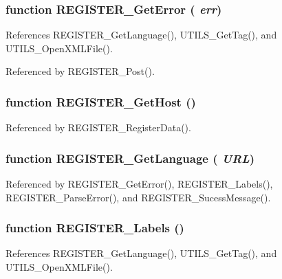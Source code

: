 \subsubsection[REGISTER\_\-GetError]{\setlength{\rightskip}{0pt plus 5cm}function REGISTER\_\-GetError ( {\em err})}\label{register_8js_0f784aa2bb5cd6b876e736d01611a1fe}




References REGISTER\_\-GetLanguage(), UTILS\_\-GetTag(), and UTILS\_\-OpenXMLFile().

Referenced by REGISTER\_\-Post().
\subsubsection[REGISTER\_\-GetHost]{\setlength{\rightskip}{0pt plus 5cm}function REGISTER\_\-GetHost ()}\label{register_8js_60682a7fc707db31243bc09b0db76b40}




Referenced by REGISTER\_\-RegisterData().
\subsubsection[REGISTER\_\-GetLanguage]{\setlength{\rightskip}{0pt plus 5cm}function REGISTER\_\-GetLanguage ( {\em URL})}\label{register_8js_ccbe8a48655edc3a8b9bfc6fd8e71c12}




Referenced by REGISTER\_\-GetError(), REGISTER\_\-Labels(), REGISTER\_\-ParseError(), and REGISTER\_\-SucessMessage().
\subsubsection[REGISTER\_\-Labels]{\setlength{\rightskip}{0pt plus 5cm}function REGISTER\_\-Labels ()}\label{register_8js_c489703e14685fd464a2d071d7938d8b}




References REGISTER\_\-GetLanguage(), UTILS\_\-GetTag(), and UTILS\_\-OpenXMLFile().
